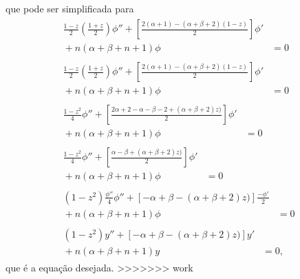 \documentclass[a4paper,12pt, leqno, answers]{exam}
\begin{document}
\begin{questions}
\begin{solution}
\begin{align*}
\begin{split}
            \end{split}
        \end{align*}
        que pode ser simplificada para
        \begin{align*}
            \begin{split}
                \frac{1 - z}{2} \left( \frac{1 + z}{2} \right) \phi'' + \left[ \frac{2(\alpha + 1) - (\alpha + \beta + 2) (1 - z)}{2} \right] \phi' \\ {}+ n (\alpha + \beta + n + 1) \phi &= 0
            \end{split} \\
            \begin{split}
                \frac{1 - z}{2} \left( \frac{1 + z}{2} \right) \phi'' + \left[ \frac{2(\alpha + 1) - (\alpha + \beta + 2) (1 - z)}{2} \right] \phi' \\ {}+ n (\alpha + \beta + n + 1) \phi &= 0
            \end{split} \\
            \begin{split}
                \frac{1 - z^2}{4} \phi'' + \left[ \frac{2\alpha + 2 - \alpha - \beta - 2 + (\alpha + \beta + 2)z)}{2} \right] \phi' \\ {}+ n (\alpha + \beta + n + 1) \phi &= 0
            \end{split} \\
            \begin{split}
                \frac{1 - z^2}{4} \phi'' + \left[ \frac{\alpha - \beta + (\alpha + \beta + 2)z)}{2} \right] \phi' \\ {}+ n (\alpha + \beta + n + 1) \phi &= 0
            \end{split} \\
            \begin{split}
                (1 - z^2) \frac{\phi''}{4} \phi'' + \left[ - \alpha + \beta - (\alpha + \beta + 2)z)\right] \frac{-\phi'}{2} \\ {}+ n (\alpha + \beta + n + 1) \phi &= 0
            \end{split} \\
            \begin{split}
                (1 - z^2) y'' + \left[ - \alpha + \beta - (\alpha + \beta + 2)z)\right] y' \\ {}+ n (\alpha + \beta + n + 1) y &= 0,
            \end{split}
        \end{align*}
        que \'{e} a equa\c{c}\~{a}o desejada.
>>>>>>> work
    \end{solution}


\end{questions}
\end{document}

